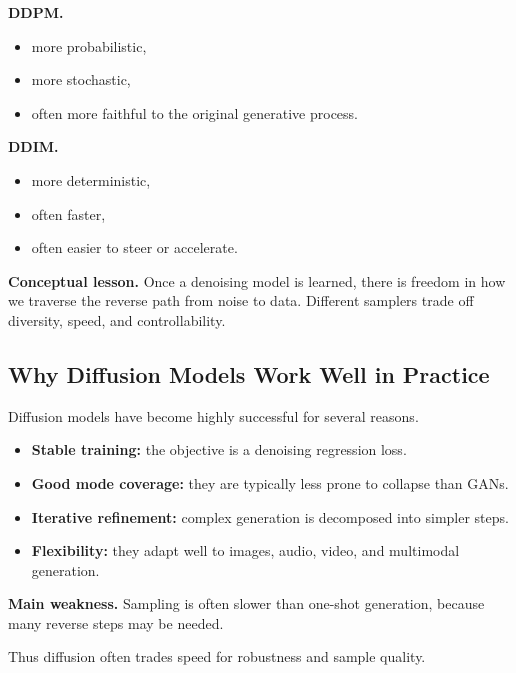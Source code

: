 \noindent
\textbf{DDPM.}
\begin{itemize}
    \item more probabilistic,
    \item more stochastic,
    \item often more faithful to the original generative process.
\end{itemize}

\medskip

\noindent
\textbf{DDIM.}
\begin{itemize}
    \item more deterministic,
    \item often faster,
    \item often easier to steer or accelerate.
\end{itemize}

\medskip

\noindent
\textbf{Conceptual lesson.}
Once a denoising model is learned, there is freedom in how we traverse the reverse path from noise to data. Different samplers trade off diversity, speed, and controllability.

\subsection{Why Diffusion Models Work Well in Practice}

Diffusion models have become highly successful for several reasons.

\begin{itemize}
    \item \textbf{Stable training:} the objective is a denoising regression loss.
    \item \textbf{Good mode coverage:} they are typically less prone to collapse than GANs.
    \item \textbf{Iterative refinement:} complex generation is decomposed into simpler steps.
    \item \textbf{Flexibility:} they adapt well to images, audio, video, and multimodal generation.
\end{itemize}

\medskip

\noindent
\textbf{Main weakness.}
Sampling is often slower than one-shot generation, because many reverse steps may be needed.

\medskip

\noindent
Thus diffusion often trades speed for robustness and sample quality.

